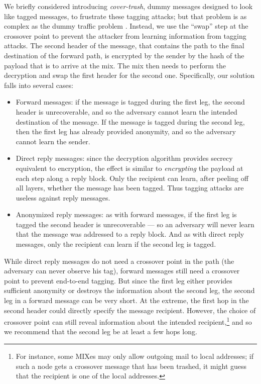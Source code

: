 \documentclass[11pt]{IEEEtran}
\begin{document}
We briefly considered introducing \emph{cover-trash}, dummy messages
designed to look like tagged messages, to frustrate
these tagging attacks; but that problem is as complex as the dummy
traffic problem \cite{langos02}. Instead, we use the
``swap'' step at the
crossover point to prevent the attacker from learning information from
tagging attacks. The second header of the message, that contains the
path to the final destination of the forward path,  is encrypted by the
sender by the hash of the payload that is to arrive at the mix. The
mix then needs to perform the decryption and swap the first header for
the second one.
Specifically, our solution falls into several cases:

\begin{itemize}
\item Forward messages: if the message is tagged during the first leg,
the second header is unrecoverable, and so the adversary cannot
learn the intended destination of the message. If the message is tagged
during the second leg, then the first leg has already provided anonymity,
and so the adversary cannot learn the sender.
\item Direct reply messages: since the decryption algorithm provides
secrecy equivalent to encryption, the effect is similar to {\em encrypting}
the payload at each step along a reply block. Only the recipient can learn,
after peeling off all layers, whether the message has been tagged. Thus
tagging attacks are useless against reply messages.
\item Anonymized reply messages: as with forward messages, if the first leg
is tagged the second header is unrecoverable --- so an adversary will
never learn that the message was addressed to a reply block. And as with
direct reply messages, only the recipient can learn if the second leg is
tagged.
\end{itemize}

While direct reply messages do not need a crossover point in the path
(the adversary can never observe his tag), forward messages still need a
crossover point to prevent end-to-end tagging. But since the first leg
either provides sufficient anonymity or destroys the information about
the second leg, the second leg in a forward message can be very short.
At the extreme, the first hop in the second header could directly
specify the message recipient. However, the choice of crossover point
can still reveal information about the intended recipient,\footnote{For instance,
some MIXes may only allow outgoing mail to local addresses; if such a
node gets a crossover message that has been trashed, it might guess
that the recipient is one of the local addresses.} and so we recommend
that the second leg be at least a few hops long.
\end{document}
